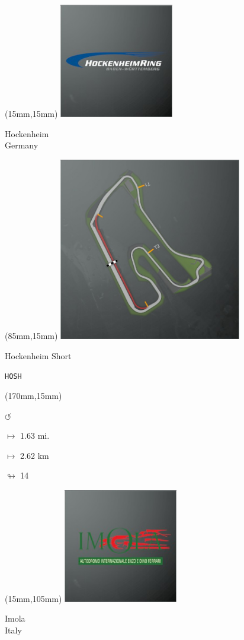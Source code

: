 \begin{textblock*}{60mm}(15mm,15mm)%
\includegraphics[width=50mm]{LG/2015-05-20_00082.png}
\par Hockenheim\\ Germany
\end{textblock*}
\begin{textblock*}{80mm}(85mm,15mm)%
\includegraphics[width=80mm]{TR/2015-05-20_00029.png}
\centerline{Hockenheim Short}
\par\hfill\tiny\tt HOSH\\
\end{textblock*}
\begin{textblock*}{30mm}(170mm,15mm)%
\par \Huge$\circlearrowleft$
\Large
\par$\mapsto$ 1.63 mi.
\par$\mapsto$ 2.62 km
\par$\looparrowright$ 14
\end{textblock*}
\begin{textblock*}{60mm}(15mm,105mm)%
\includegraphics[width=50mm]{LG/2015-05-20_00083.png}
\par Imola\\ Italy
\end{textblock*}
